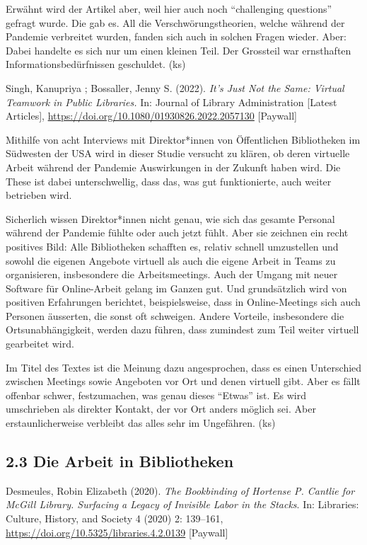 \documentclass[a4paper,
fontsize=11pt,
oneside,
numbers=noperiodatend,
parskip=half-,
bibliography=totoc,
final
]{scrartcl}
\begin{document}
Erwähnt wird der Artikel aber, weil hier auch noch \enquote{challenging
questions} gefragt wurde. Die gab es. All die Verschwörungstheorien,
welche während der Pandemie verbreitet wurden, fanden sich auch in
solchen Fragen wieder. Aber: Dabei handelte es sich nur um einen kleinen
Teil. Der Grossteil war ernsthaften Informationsbedürfnissen geschuldet.
(ks)

Singh, Kanupriya ; Bossaller, Jenny S. (2022). \emph{It's Just Not the
Same: Virtual Teamwork in Public Libraries.} In: Journal of Library
Administration {[}Latest Articles{]},
\url{https://doi.org/10.1080/01930826.2022.2057130} {[}Paywall{]}

Mithilfe von acht Interviews mit Direktor*innen von Öffentlichen
Bibliotheken im Südwesten der USA wird in dieser Studie versucht zu
klären, ob deren virtuelle Arbeit während der Pandemie Auswirkungen in
der Zukunft haben wird. Die These ist dabei unterschwellig, dass das,
was gut funktionierte, auch weiter betrieben wird.

Sicherlich wissen Direktor*innen nicht genau, wie sich das gesamte
Personal während der Pandemie fühlte oder auch jetzt fühlt. Aber sie
zeichnen ein recht positives Bild: Alle Bibliotheken schafften es,
relativ schnell umzustellen und sowohl die eigenen Angebote virtuell als
auch die eigene Arbeit in Teams zu organisieren, insbesondere die
Arbeitsmeetings. Auch der Umgang mit neuer Software für Online-Arbeit
gelang im Ganzen gut. Und grundsätzlich wird von positiven Erfahrungen
berichtet, beispielsweise, dass in Online-Meetings sich auch Personen
äusserten, die sonst oft schweigen. Andere Vorteile, insbesondere die
Ortsunabhängigkeit, werden dazu führen, dass zumindest zum Teil weiter
virtuell gearbeitet wird.

Im Titel des Textes ist die Meinung dazu angesprochen, dass es einen
Unterschied zwischen Meetings sowie Angeboten vor Ort und denen virtuell
gibt. Aber es fällt offenbar schwer, festzumachen, was genau dieses
\enquote{Etwas} ist. Es wird umschrieben als direkter Kontakt, der vor
Ort anders möglich sei. Aber erstaunlicherweise verbleibt das alles sehr
im Ungefähren. (ks)

\hypertarget{die-arbeit-in-bibliotheken}{%
\subsection{2.3 Die Arbeit in
Bibliotheken}\label{die-arbeit-in-bibliotheken}}

Desmeules, Robin Elizabeth (2020). \emph{The Bookbinding of Hortense P.
Cantlie for McGill Library. Surfacing a Legacy of Invisible Labor in the
Stacks}. In: Libraries: Culture, History, and Society 4 (2020) 2:
139--161, \url{https://doi.org/10.5325/libraries.4.2.0139} {[}Paywall{]}
\end{document}
